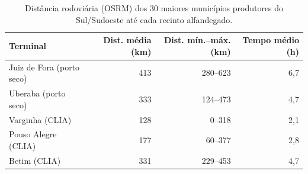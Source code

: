 \begin{table}[htbp]
\centering
\small
\caption{Distância rodoviária (OSRM) dos 30 maiores municípios produtores do Sul/Sudoeste até cada recinto alfandegado.}
\label{tab:dist_terminais}
\begin{tabular}{lrrr}
\toprule
Terminal & Dist. média (km) & Dist. mín.--máx. (km) & Tempo médio (h) \\
\midrule
Juiz de Fora (porto seco) & 413 & 280--623 & 6,7 \\
Uberaba (porto seco) & 333 & 124--473 & 4,7 \\
Varginha (CLIA) & 128 & 0--318 & 2,1 \\
Pouso Alegre (CLIA) & 177 & 60--377 & 2,8 \\
Betim (CLIA) & 331 & 229--453 & 4,7 \\
\bottomrule
\end{tabular}
\end{table}
